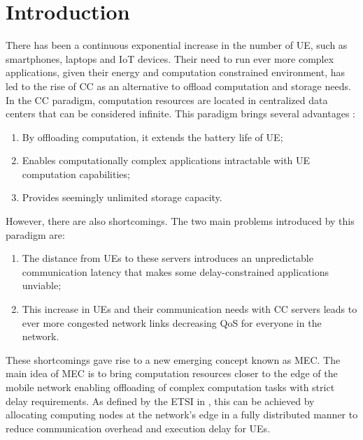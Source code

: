 \documentclass[conference]{IEEEtran}
\begin{document}
\section{Introduction}

\noindent There has been a continuous exponential increase in the number of \acrfull{UE}, such as smartphones, laptops and \acrfull{IoT} devices. Their need to run ever more complex applications, given their energy and computation constrained environment, has led to the rise of \acrfull{CC} as an alternative to offload computation and storage needs. In the \acrshort{CC} paradigm, computation resources are located in centralized data centers that can be considered infinite. This paradigm brings several advantages \cite{SHAKARAMI2020107496}: 
\begin{enumerate}
    \item By offloading computation, it extends the battery life of \acrshort{UE}; 
    \item Enables computationally complex applications intractable with \acrshort{UE} computation capabilities;
    \item Provides seemingly unlimited storage capacity.
\end{enumerate}
However, there are also shortcomings. The two main problems introduced by this paradigm are: 
\begin{enumerate}
    \item The distance from \acrshort{UE}s to these servers introduces an unpredictable communication latency that makes some delay-constrained applications unviable;
    \item  This increase in \acrshort{UE}s and their communication needs with \acrshort{CC} servers leads to ever more congested network links decreasing \acrfull{QoS} for everyone in the network.
\end{enumerate}

\par
These shortcomings gave rise to a new emerging concept known as \acrfull{MEC}. The main idea of \acrshort{MEC} is to bring computation resources closer to the edge of the mobile network enabling offloading of complex computation tasks with strict delay requirements. As defined by the \acrfull{ETSI} in \cite{MECspec}, this can be achieved by allocating computing nodes at the network's edge in a fully distributed manner to reduce communication overhead and execution delay for \acrshort{UE}s.
\end{document}
